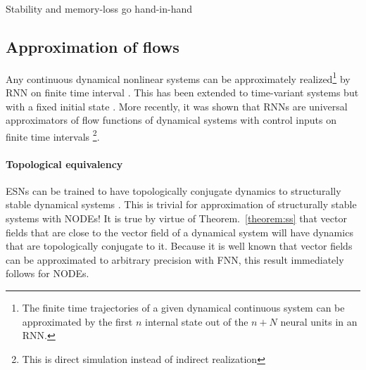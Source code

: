 \documentclass{article}
\theoremstyle{definition}
\theoremstyle{remark}
\newcommand{\reals}{\mathbb{R}}
\newcounter{ct}
\begin{document}
Stability and memory-loss go hand-in-hand \citep{manjunath2020stability}


\subsection{Approximation of flows}
Any continuous dynamical nonlinear systems can be approximately realized\footnote{The finite time trajectories of a given dynamical continuous system can be approximated by the first $n$ internal state out of the $n + N$ neural units in an RNN.} by RNN on finite time interval \citep{chow2000modeling}.
%
This has been extended to time-variant systems but with a fixed initial state \citep{li2005approximation}. %
%
More recently, it was shown that RNNs are universal approximators of flow functions of dynamical systems  with control inputs on finite time intervals  \citep{aguiar2023universal}\footnote{This is direct simulation instead of indirect realization}. %



\paragraph{Topological equivalency}
ESNs can be trained to have  topologically conjugate dynamics to structurally stable dynamical systems \citep{hart2020embedding}.
This is trivial for approximation of structurally stable systems with NODEs!
It is true by virtue of Theorem.~\ref{theorem:ss} that vector fields that are close to the vector field of a dynamical system will have dynamics that are topologically conjugate to it.
Because it is well known that vector fields can be approximated to arbitrary precision with FNN, this result immediately follows for NODEs.

\end{document}
